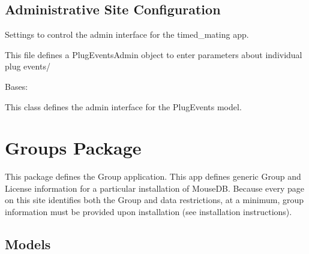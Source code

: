 \documentclass[letterpaper,10pt,english]{sphinxmanual}
\begin{document}
\begin{fulllineitems}
\label{api:timed_mating.urls.limited_object_list}
\end{fulllineitems}



\subsection{Administrative Site Configuration}
\label{api:id8}\label{api:module-timed_mating.admin}
Settings to control the admin interface for the timed\_mating app.

This file defines a PlugEventsAdmin object to enter parameters about individual plug events/

\begin{fulllineitems}
\label{api:timed_mating.admin.PlugEventsAdmin}
Bases: 

This class defines the admin interface for the PlugEvents model.

\begin{fulllineitems}
\label{api:timed_mating.admin.PlugEventsAdmin.media}
\end{fulllineitems}


\end{fulllineitems}



\section{Groups Package}
\label{api:module-groups}\label{api:groups-package}
This package defines the Group application.
This app defines generic Group and License information for a particular installation of MouseDB.  
Because every page on this site identifies both the Group and data restrictions, at a minimum, group information must be provided upon installation (see installation instructions).


\subsection{Models}
\label{api:id9}\label{api:module-groups.models}
\end{document}
